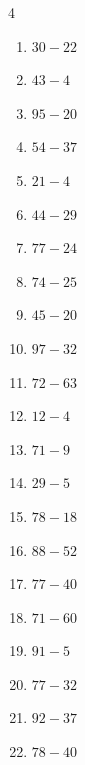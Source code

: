 \begin{multicols}{4}
\begin{enumerate}
  \item $30-22$
        \phantom{$=8$}

  \item $43-4$
        \phantom{$=39$}

  \item $95-20$
        \phantom{$=75$}

  \item $54-37$
        \phantom{$=17$}

  \item $21-4$
        \phantom{$=17$}

  \item $44-29$
        \phantom{$=15$}

  \item $77-24$
        \phantom{$=53$}

  \item $74-25$
        \phantom{$=49$}

\columnbreak %

  \item $45-20$
        \phantom{$=25$}

  \item $97-32$
        \phantom{$=65$}

  \item $72-63$
        \phantom{$=9$}

  \item $12-4$
        \phantom{$=8$}

  \item $71-9$
        \phantom{$=62$}

  \item $29-5$
        \phantom{$=24$}

  \item $78-18$
        \phantom{$=60$}

  \item $88-52$
        \phantom{$=36$}

  \item $77-40$
        \phantom{$=37$}

  \item $71-60$
        \phantom{$=11$}

  \item $91-5$
        \phantom{$=86$}

  \item $77-32$
        \phantom{$=45$}

  \item $92-37$
        \phantom{$=55$}

  \item $78-40$
        \phantom{$=38$}


\end{enumerate}
\end{multicols}
